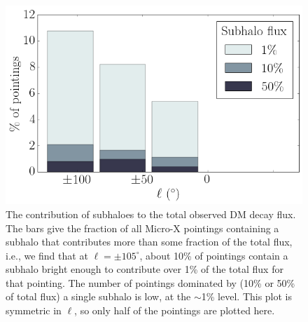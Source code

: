 \documentclass[aps,prd,10pt,twocolumn,superscriptaddress,showpacs,footinbib]{revtex4-1}
\begin{document}
\begin{figure}[h!]
\centering
\includegraphics[width=1.0\columnwidth]{subhalo_flux.png}
\caption{ 
	The contribution of subhaloes to the total observed DM decay flux. 
	The bars give the fraction of all Micro-X pointings containing a subhalo that
	contributes more than some fraction of the total flux, i.e., we find that at $\ell=\pm105^\circ$,
	about 10\% of pointings contain a subhalo bright enough to contribute over 1\% of the total flux
	for that pointing. The number of pointings dominated by (10\% or 50\% of total flux) a single subhalo is low, at
	the $\sim$1\% level. This plot is symmetric in $\ell$, so only half of the pointings are plotted
	here.
}
\label{fig:subhalo_flux}
\end{figure}
\end{document}
